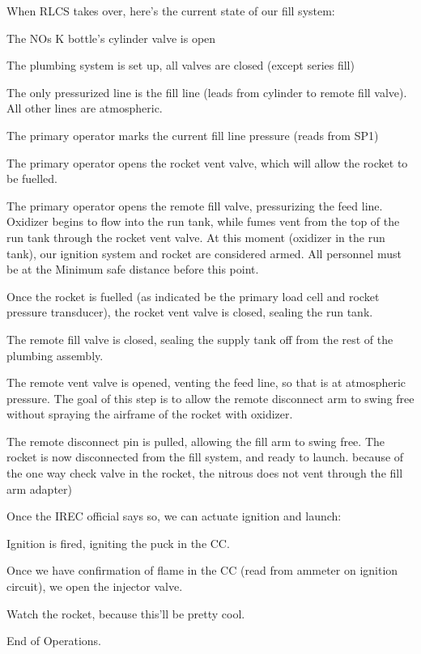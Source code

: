 \documentclass[letter]{article}
\begin{document}
\begin{checklist}
    \item When RLCS takes over, here's the current state of our fill system: 
    \begin{checklist}
        \item The NOs K bottle's cylinder valve is open 
        \item The plumbing system is set up, all valves are closed (except series
              fill)
        \item The only pressurized line is the fill line (leads from cylinder to
              remote fill valve). All other lines are atmospheric.
    \end{checklist}
    \item The primary operator marks the current fill line pressure (reads from SP1)
    \item The primary operator opens the rocket vent valve, which will allow the
            rocket to be fuelled.
    \item The primary operator opens the remote fill valve, pressurizing the feed
            line.  Oxidizer begins to flow into the run tank, while fumes vent from the
            top of the run tank through the rocket vent valve. At this moment (oxidizer in
            the run tank), our ignition system and rocket are considered armed. All
            personnel must be at the Minimum safe distance before this point.
    \item Once the rocket is fuelled (as indicated be the primary load cell and rocket
            pressure transducer), the rocket vent valve is closed, sealing the run tank.
    \item The remote fill valve is closed, sealing the supply tank off from the rest
            of the plumbing assembly.  
    \item The remote vent valve is opened, venting the feed line, so that is at
            atmospheric pressure. The goal of this step is to allow the remote
            disconnect arm to swing free without spraying the airframe of the rocket
            with oxidizer.
    \item The remote disconnect pin is pulled, allowing the fill arm to swing free.
            The rocket is now disconnected from the fill system, and ready to launch.
            because of the one way check valve in the rocket, the nitrous does not vent
            through the fill arm adapter)
    \item Once the IREC official says so, we can actuate ignition and launch:
    \begin{checklist}
        \item Ignition is fired, igniting the puck in the CC.
        \item Once we have confirmation of flame in the CC (read from ammeter on
                ignition circuit), we open the injector valve.
        \item Watch the rocket, because this'll be pretty cool.
    \end{checklist}
\end{checklist}

End of Operations.
\end{document}
